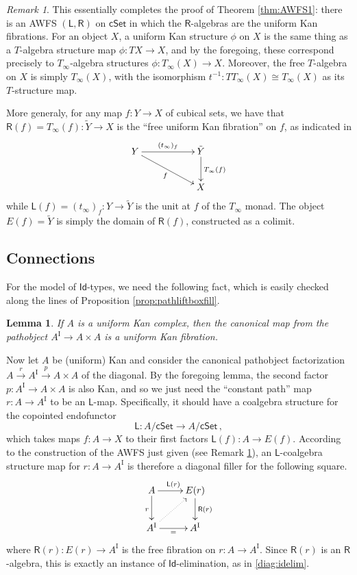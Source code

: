 \documentclass[12pt]{article}
\newcommand{\cSet}{\ensuremath{\mathsf{cSet}}}
\newcommand{\LL}{\ensuremath{\mathsf{L}}}
\newcommand{\RR}{\ensuremath{\mathsf{R}}}
\newcommand{\Tinf}{\ensuremath{T_\infty}}
\newcommand{\I}{\ensuremath{\mathrm{I}}}
\newcommand{\Id}{\ensuremath{\mathsf{Id}}}
\newtheorem{lemma}[theorem]{Lemma}
\theoremstyle{remark}
\newtheorem{remark}[theorem]{Remark}
\theoremstyle{definition}
\begin{document}
\begin{remark}\label{rem:AWFS1}
This essentially completes the proof of Theorem \ref{thm:AWFS1}: there is an AWFS $(\LL,\RR)$ on $\cSet$ in which the $\RR$-algebras are the uniform Kan fibrations.  For an object $X$, a uniform Kan structure $\phi$ on $X$ is the same thing as a $T$-algebra structure map $\phi : TX\to X$, and by the foregoing, these correspond precisely to $\Tinf$-algebra structures $\phi:\Tinf(X) \to X$.  Moreover, the free $T$-algebra on $X$ is simply $\Tinf(X)$, with the isomorphism $t^{-1} : T\Tinf(X) \cong \Tinf(X)$ as its $T$-structure map.

More generaly, for any map $f:Y\to X$ of cubical sets, we have that  $\RR(f) = \Tinf(f) : \tilde{Y} \to X$ is the ``free uniform Kan fibration'' on $f$, as indicated in
\begin{equation}%
\xymatrix{
Y \ar[rrd]_{f} \ar[rr]^{(t_\infty)_f} && \ar[d]^{\Tinf(f)} \tilde{Y} \\
&& X
}
\end{equation}
while $\LL(f) = (t_\infty)_f : Y \to \tilde{Y}$ is the unit at $f$ of the $\Tinf$ monad.  The object $E(f) = \tilde{Y}$ is simply the domain of $\RR(f)$, constructed as a colimit.
\end{remark}

\subsection{Connections}

For the model of \Id-types, we need the following fact, which is easily checked along the lines of Proposition \ref{prop:pathliftboxfill}.

\begin{lemma}
If $A$ is a uniform Kan complex, then the canonical map from the pathobject $A^\I \to A\times A$ is a uniform Kan fibration.
\end{lemma}

Now let $A$ be (uniform) Kan and consider the canonical pathobject factorization $A\stackrel{r}{\to} A^\I \stackrel{p}{\to} A\times A$ of the diagonal.  By the foregoing lemma, the second factor $p : A^\I \to A\times A$ is also Kan, and so we just need the ``constant path'' map $r : A \to A^\I$ to be an $\LL$-map.  Specifically, it should have a coalgebra structure for the copointed endofunctor
\[
\LL : A/\cSet \longrightarrow A/\cSet\,,
\]
which takes maps $f : A\to X$ to their first factors $\LL(f): A \to E(f)$.  According to the construction of the AWFS just given (see Remark \ref{rem:AWFS1}), an $\LL$-coalgebra structure map for $r:A\to A^\I$ is therefore a diagonal filler for the following square.
\begin{equation}\label{diagram:reflL}
\xymatrix{
A \ar[d]_{r} \ar[r]^{\LL(r)} & \ar[d]^{\RR(r)} E(r) \\
A^\I \ar@{..>}[ru] \ar[r]_{=} & A^\I
}
\end{equation}
where $\RR(r):E(r) \to A^\I$ is the free fibration on $r : A \to A^\I$.  Since $\RR(r)$ is an $\RR$-algebra, this is exactly an instance of \Id-elimination, as in \eqref{diag:idelim}.
\end{document}
